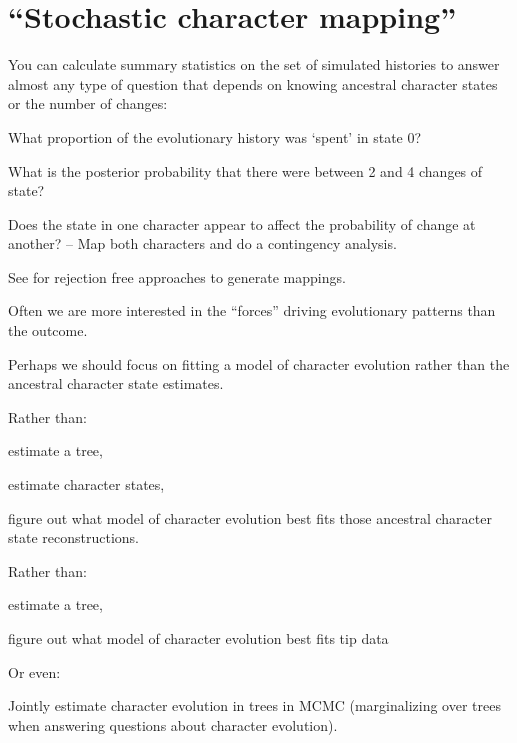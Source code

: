 \documentclass[landscape]{foils}
\begin{document}
\myNewSlide
\section*{``Stochastic character mapping'' }
You can calculate summary statistics on the set of simulated histories to answer almost any type of question that depends on knowing ancestral character states or the number of changes:
\begin{compactitem}
	\item What proportion of the evolutionary history was `spent' in state 0?
	\item What is the posterior probability that there were between 2 and 4 changes of state?
	\item Does the state in one character appear to affect the probability of change at another? -- Map both characters and do a contingency analysis.
\end{compactitem}
	
See \citet{MininS2008MB,MininS2008PRSoc,ObrienMS2009} for rejection free approaches to generate mappings.

\myNewSlide

Often we are more interested in the ``forces'' driving evolutionary patterns than the outcome.

Perhaps we should focus on fitting a model of character evolution rather than the ancestral character state estimates.

\myNewSlide
Rather than:
\begin{compactenum}
	\item estimate a tree,
	\item estimate character states,
	\item figure out what model of character evolution best fits those ancestral character state reconstructions.
\end{compactenum}

Rather than:
\begin{compactenum}
	\item estimate a tree,
	\item figure out what model of character evolution best fits tip data
\end{compactenum}

Or even:
\begin{compactenum}
	\item Jointly estimate character evolution in trees in MCMC (marginalizing over trees when answering questions about character evolution).
\end{compactenum}
\end{document}
